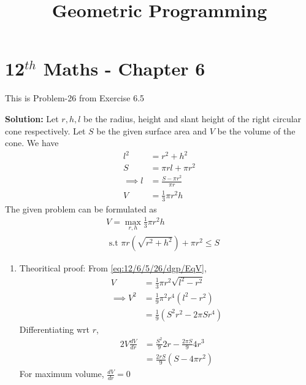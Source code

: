 \documentclass[12pt]{article}
\providecommand{\brak}[1]{\ensuremath{\left(#1\right)}}
\newcommand{\solution}{\noindent \textbf{Solution: }}
\begin{document}
\begin{center}
\title{\textbf{Geometric Programming}}
\date{\vspace{-5ex}} %
\maketitle
\end{center}
\setcounter{page}{1}

\section{12$^{th}$ Maths - Chapter 6}
This is Problem-26 from Exercise 6.5 
\begin{enumerate}

\solution 
\fi
Let $r,h,l$ be the radius, height and slant height of the right circular cone respectively. Let $S$ be the given surface area and $V$ be the volume of the cone. We have 
\begin{align}
	l^2 &= r^2 + h^2 \\
	S &= \pi rl + \pi r^2 \\
	\implies l &= \frac{S-\pi r^2}{\pi r}\\
	\label{eq:12/6/5/26/dgp/EqV}
	V &= \frac{1}{3}\pi r^2h 
\end{align}
The given problem can be formulated as 
\begin{align}
	\label{eq:12/6/5/26/dgp/EqMax}
	& V = \max_{r,h} \frac{1}{3}\pi r^2h \\
	\label{eq:12/6/5/26/dgp/EqConstr}
	&\text { s.t } \pi r\brak{\sqrt{r^2+h^2}} + \pi r^2 \leq S 
\end{align}
\begin{enumerate}
\item Theoritical proof: From \eqref{eq:12/6/5/26/dgp/EqV},
\begin{align}
	 V &= \frac{1}{3}\pi r^2\sqrt{l^2-r^2} \\
\implies	V^2 &= \frac{1}{9}\pi^2 r^4\brak{l^2-r^2} \\
	&= \frac{1}{9} \brak{S^2r^2- 2\pi S r^4 } 
\end{align}
Differentiating wrt $r$,
\begin{align}
	\label{eq:12/6/5/26/dgp/EqDer}
	2V \frac{dV}{dr} &= \frac{S^2}{9}2r - \frac{2\pi S}{9}4r^3 \\ 
	&= \frac{2rS}{9}\brak{ S- 4\pi r^2} 
\end{align}
For maximum volume, $\frac{dV}{dr} = 0$
\begin{align}

\end{align}
\end{enumerate}
\end{enumerate}
\end{document}
